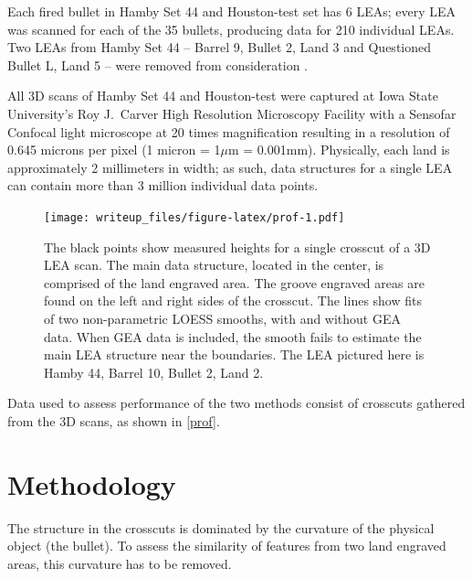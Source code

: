 \documentclass[12pt]{article}
\begin{document}
Each fired bullet in Hamby Set 44 and Houston-test set has 6 LEAs; every
LEA was scanned for each of the 35 {\color{teal}{plus houston-test}}
bullets, producing data for 210 individual LEAs. Two LEAs from Hamby Set
44 -- Barrel 9, Bullet 2, Land 3 and Questioned Bullet L, Land 5 -- were
removed from consideration
{\color{teal}{because they were deemed unsuitable for comparison. These two LEAs contained significant abrasians created by contact with the bottom of a water recovery tank after exiting the barrel. These abrasians are thus marks present on the LEAs that are not due to contact with the barrel itself}}.

All 3D scans of Hamby Set 44 and Houston-test were captured at Iowa
State University's Roy J.~Carver High Resolution Microscopy Facility
with a Sensofar Confocal light microscope at 20 times magnification
resulting in a resolution of 0.645 microns per pixel (1 micron =
1\(\mu\)m = 0.001mm). Physically, each land is approximately 2
millimeters in width; as such, data structures for a single LEA can
contain more than 3 million individual data points.

\begin{figure}
\centering
\texttt{[image: writeup\_files/figure-latex/prof-1.pdf]}
\caption{\label{prof}The black points show measured heights for a single
crosscut of a 3D LEA scan. The main data structure, located in the
center, is comprised of the land engraved area. The groove engraved
areas are found on the left and right sides of the crosscut. The lines
show fits of two non-parametric LOESS smooths, with and without GEA
data. When GEA data is included, the smooth fails to estimate the main
LEA structure near the boundaries. The LEA pictured here is Hamby 44,
Barrel 10, Bullet 2, Land 2.}
\end{figure}

Data used to assess performance of the two methods consist of crosscuts
gathered from the 3D scans, as shown in \autoref{prof}.

\section{Methodology}

The structure in the crosscuts is dominated by the curvature of the
physical object (the bullet). To assess the similarity of features from
two land engraved areas, this curvature has to be removed.
\end{document}
